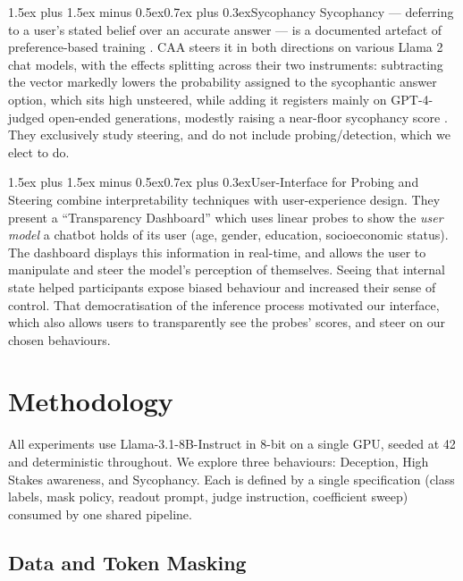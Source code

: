 \documentclass[conference]{IEEEtran}
\makeatletter
\renewcommand{\paragraph}{\@startsection{paragraph}{4}{2em}%
  {1.5ex plus 1.5ex minus 0.5ex}{0.7ex plus 0.3ex}{\normalfont\normalsize\itshape}}
\makeatother
\begin{document}
\paragraph{Sycophancy}
Sycophancy --- deferring to a user's stated belief over an accurate answer ---
is a documented artefact of preference-based training
\citep{perez2023,sharma2023}. CAA steers it in both directions on various
Llama 2 chat models, with the effects splitting across their two instruments:
subtracting the vector markedly lowers the probability assigned to the
sycophantic answer option, which sits high unsteered, while adding it registers
mainly on GPT-4-judged open-ended generations, modestly raising a near-floor
sycophancy score \citep{rimsky2024}. They exclusively study steering, and do
not include probing/detection, which we elect to do.

\paragraph{User-Interface for Probing and Steering}
\citet{chen2024} combine interpretability techniques with user-experience
design. They present a ``Transparency Dashboard'' which uses linear probes to
show the \emph{user model} a chatbot holds of its user (age, gender, education,
socioeconomic status). The dashboard displays this information in real-time,
and allows the user to manipulate and steer the model's perception of
themselves. Seeing that internal state helped participants expose biased
behaviour and increased their sense of control. That democratisation of the
inference process motivated our interface, which also allows users to
transparently see the probes' scores, and steer on our chosen behaviours.

\section{Methodology}
\label{sec:methodology}

All experiments use Llama-3.1-8B-Instruct in 8-bit on a single GPU, seeded at
42 and deterministic throughout. We explore three behaviours: Deception, High
Stakes awareness, and Sycophancy. Each is defined by a single specification
(class labels, mask policy, readout prompt, judge instruction, coefficient
sweep) consumed by one shared pipeline.

\subsection{Data and Token Masking}
\label{sec:masking}
\end{document}
